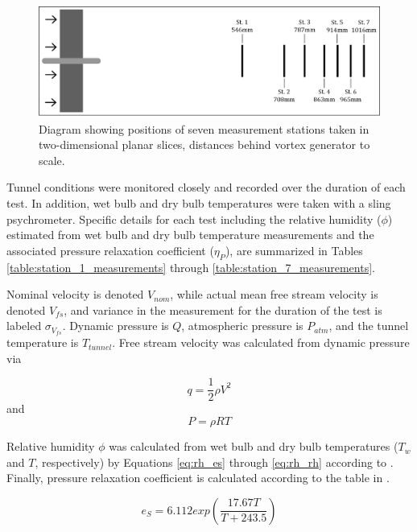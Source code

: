 \vspace{32pt}
\begin{figure}[H]
	\centering
	\includegraphics[width=6in]{figs/setup/station_diagram}
	\caption{Diagram showing positions of seven measurement stations taken in 
		two-dimensional planar slices, distances behind vortex generator to 
		scale.}
	\label{fig:station_diagram}
\end{figure}

Tunnel conditions were monitored closely and recorded over the duration of each 
test. In addition, wet bulb and dry bulb temperatures were taken with a sling 
psychrometer. Specific details for each test including the relative humidity 
($\phi$) estimated from wet bulb and dry bulb temperature measurements and the
associated pressure relaxation coefficient 
($\eta_P$), are summarized in Tables \ref{table:station_1_measurements} through 
\ref{table:station_7_measurements}. 

Nominal velocity is denoted $V_{nom}$, while actual mean free stream 
velocity is denoted $V_{fs}$, and variance in the measurement for the 
duration of the test is labeled $\sigma_{V_{fs}}$. Dynamic pressure is $Q$, 
atmospheric 
pressure is $P_{atm}$, and the tunnel temperature is $T_{tunnel}$. Free stream 
velocity was calculated from dynamic pressure via

\begin{equation}
q = \frac{1}{2}\rho V^2
\end{equation}
\noindent
and
\begin{equation}
P = \rho R T
\end{equation}

Relative 
humidity $\phi$ was calculated from wet bulb and dry bulb temperatures ($T_w$ 
and $T$, respectively) by 
Equations \ref{eq:rh_es} through \ref{eq:rh_rh} according to \cite{owen1977}. 
Finally, pressure relaxation coefficient is calculated according to the table 
in \cite{ash2011}.

\begin{equation}
e_S = 6.112 exp \left( \frac{17.67 T}{T + 243.5} \right)
\label{eq:rh_es}
\end{equation}

